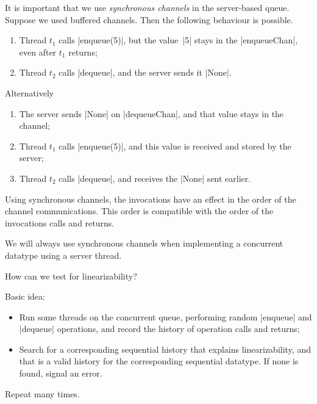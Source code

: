 
\begin{slide}

It is important that we use \emph{synchronous channels} in the server-based
queue.  Suppose we used buffered channels.  Then the following behaviour is
possible.
%
\begin{enumerate}
\item Thread $t_1$ calls |enqueue(5)|, but the value~|5| stays in the
  |enqueueChan|, even after $t_1$ returns;

\item Thread $t_2$ calls |dequeue|, and the server sends it |None|.
\end{enumerate}

Alternatively
%
\begin{enumerate}
\item The server sends |None| on |dequeueChan|, and that value stays in the
  channel; 

\item Thread $t_1$ calls |enqueue(5)|, and this value is received and stored
  by the server; 

\item Thread $t_2$ calls |dequeue|, and receives the |None| sent earlier.
\end{enumerate}
\end{slide}


\begin{slide}

Using synchronous channels, the invocations have an effect in the order of the
channel communications.  This order is compatible with the order of the
invocations calls and returns.

We will always use synchronous channels when implementing a concurrent
datatype using a server thread.   
\end{slide}



\begin{slide}

How can we test for linearizability?

Basic idea: 
%
\begin{itemize}
\item Run some threads on the concurrent queue, performing random |enqueue|
and |dequeue| operations, and record the history of operation calls and
returns;

\item Search for a corresponding sequential history that explains
linearizability, and that is a valid history for the corresponding sequential
datatype.  If none is found, signal an error.
\end{itemize}
%
Repeat many times.
\end{slide}


